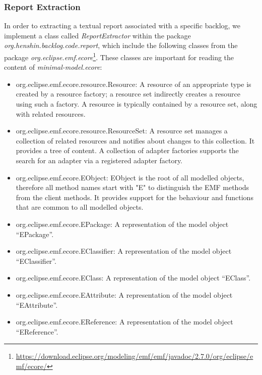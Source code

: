 \subsubsection*{Report Extraction}\label{step_report_extraction}
In order to extracting a textual report associated with a specific backlog, we implement a class called \textit{ReportExtractor} within the package \textit{org.henshin.backlog.code.report}, which include the following classes from the package \textit{org.eclipse.emf.ecore}\footnote{\href{https://download.eclipse.org/modeling/emf/emf/javadoc/2.7.0/org/eclipse/emf/ecore/}{https://download.eclipse.org/modeling/emf/emf/javadoc/2.7.0/org/eclipse/emf/ecore/}}. These classes are important for reading the content of \textit{minimal-model.ecore}:
\begin{itemize}
	
	\item org.eclipse.emf.ecore.resource.Resource: A resource of an appropriate type is created by a resource factory; a resource set indirectly creates a resource using such a factory. A resource is typically contained by a resource set, along with related resources.
	
	\item org.eclipse.emf.ecore.resource.ResourceSet: A resource set manages a collection of related resources and notifies about changes to this collection. It provides a tree of content. A collection of adapter factories supports the search for an adapter via a registered adapter factory. 
	
	\item org.eclipse.emf.ecore.EObject: EObject is the root of all modelled objects, therefore all method names start with "E" to distinguish the EMF methods from the client methods. It provides support for the behaviour and functions that are common to all modelled objects.
	
	\item org.eclipse.emf.ecore.EPackage: A representation of the model object \enquote{EPackage}.
	
	\item org.eclipse.emf.ecore.EClassifier: A representation of the model object \enquote{EClassifier}.
	
	\item org.eclipse.emf.ecore.EClass: A representation of the model object \enquote{EClass}.
	
	\item org.eclipse.emf.ecore.EAttribute: A representation of the model object \enquote{EAttribute}.
	
	\item org.eclipse.emf.ecore.EReference:  A representation of the model object \enquote{EReference}.
	
\end{itemize}
